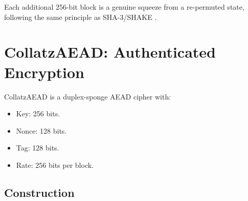 \documentclass[11pt,a4paper]{article}
\begin{document}
Each additional 256-bit block is a genuine squeeze from a re-permuted
state, following the same principle as SHA-3/SHAKE \cite{sha3}.

\section{CollatzAEAD: Authenticated Encryption}
\label{sec:aead}

CollatzAEAD is a duplex-sponge AEAD cipher \cite{duplex} with:
\begin{itemize}
    \item Key: 256 bits.
    \item Nonce: 128 bits.
    \item Tag: 128 bits.
    \item Rate: 256 bits per block.
\end{itemize}

\subsection{Construction}
\end{document}
